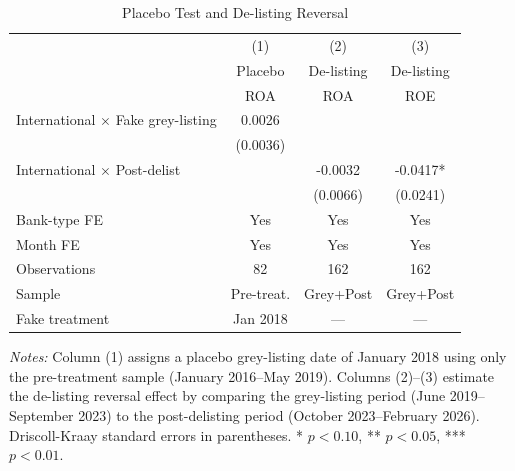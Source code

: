\begin{table}[H]
\centering
\caption{Placebo Test and De-listing Reversal}
\label{tab:placebo}
\begin{threeparttable}
\begin{tabular}{lccc}
\toprule
 & (1) & (2) & (3) \\
 & Placebo & De-listing & De-listing \\
 & ROA & ROA & ROE \\
\midrule
International $\times$ Fake grey-listing & 0.0026 & & \\
 & (0.0036) & & \\[6pt]
International $\times$ Post-delist & & -0.0032 & -0.0417* \\
 & & (0.0066) & (0.0241) \\
\midrule
Bank-type FE & Yes & Yes & Yes \\
Month FE & Yes & Yes & Yes \\
Observations & 82 & 162 & 162 \\
Sample & Pre-treat. & Grey+Post & Grey+Post \\
Fake treatment & Jan 2018 & --- & --- \\
\bottomrule
\end{tabular}
\begin{tablenotes}[flushleft]
\small
\item \textit{Notes:} Column (1) assigns a placebo grey-listing date of January 2018 using only the pre-treatment sample (January 2016--May 2019). Columns (2)--(3) estimate the de-listing reversal effect by comparing the grey-listing period (June 2019--September 2023) to the post-delisting period (October 2023--February 2026). Driscoll-Kraay standard errors in parentheses. * $p<0.10$, ** $p<0.05$, *** $p<0.01$.
\end{tablenotes}
\end{threeparttable}
\end{table}

